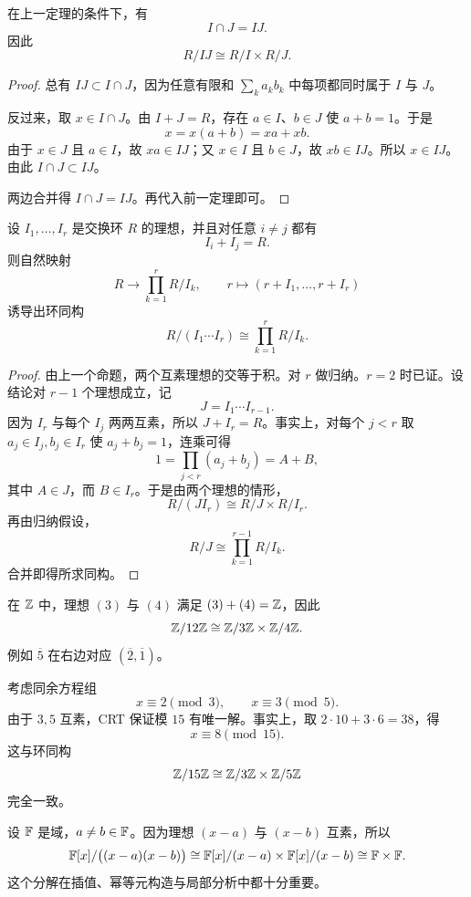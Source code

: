 \begin{proposition}
在上一定理的条件下，有
\[
I\cap J=IJ.
\]
因此
\[
R/IJ\cong R/I\times R/J.
\]
\end{proposition}

\begin{proof}
总有 $IJ\subset I\cap J$，因为任意有限和 $\sum_k a_kb_k$ 中每项都同时属于 $I$ 与 $J$。

反过来，取 $x\in I\cap J$。由 $I+J=R$，存在 $a\in I$、$b\in J$ 使 $a+b=1$。于是
\[
x=x(a+b)=xa+xb.
\]
由于 $x\in J$ 且 $a\in I$，故 $xa\in IJ$；又 $x\in I$ 且 $b\in J$，故 $xb\in IJ$。所以 $x\in IJ$。由此 $I\cap J\subset IJ$。

两边合并得 $I\cap J=IJ$。再代入前一定理即可。
\end{proof}

\begin{theorem}[有限个两两互素理想的情形]
设 $I_1,\dots,I_r$ 是交换环 $R$ 的理想，并且对任意 $i\neq j$ 都有
\[
I_i+I_j=R.
\]
则自然映射
\[
R\longrightarrow \prod_{k=1}^r R/I_k,
\qquad r\longmapsto (r+I_1,\dots,r+I_r)
\]
诱导出环同构
\[
R/(I_1\cdots I_r)\cong \prod_{k=1}^r R/I_k.
\]
\end{theorem}

\begin{proof}
由上一个命题，两个互素理想的交等于积。对 $r$ 做归纳。$r=2$ 时已证。设结论对 $r-1$ 个理想成立，记
\[
J=I_1\cdots I_{r-1}.
\]
因为 $I_r$ 与每个 $I_j$ 两两互素，所以 $J+I_r=R$。事实上，对每个 $j<r$ 取 $a_j\in I_j,b_j\in I_r$ 使 $a_j+b_j=1$，连乘可得
\[
1=\prod_{j<r}(a_j+b_j)=A+B,
\]
其中 $A\in J$，而 $B\in I_r$。于是由两个理想的情形，
\[
R/(JI_r)\cong R/J\times R/I_r.
\]
再由归纳假设，
\[
R/J\cong \prod_{k=1}^{r-1}R/I_k.
\]
合并即得所求同构。
\end{proof}

\begin{example}
在 $\mathbb{Z}$ 中，理想 $(3)$ 与 $(4)$ 满足 $(3)+(4)=\mathbb{Z}$，因此
\[
\mathbb{Z}/12\mathbb{Z}\cong \mathbb{Z}/3\mathbb{Z}\times \mathbb{Z}/4\mathbb{Z}.
\]
例如 $\overline{5}$ 在右边对应 $(\overline{2},\overline{1})$。
\end{example}

\begin{example}
考虑同余方程组
\[
x\equiv 2\pmod 3,
\qquad
x\equiv 3\pmod 5.
\]
由于 $3,5$ 互素，CRT 保证模 $15$ 有唯一解。事实上，取 $2\cdot 10+3\cdot 6=38$，得
\[
x\equiv 8\pmod{15}.
\]
这与环同构
\[
\mathbb{Z}/15\mathbb{Z}\cong \mathbb{Z}/3\mathbb{Z}\times \mathbb{Z}/5\mathbb{Z}
\]
完全一致。
\end{example}

\begin{example}
设 $\mathbb{F}$ 是域，$a\neq b\in \mathbb{F}$。因为理想 $(x-a)$ 与 $(x-b)$ 互素，所以
\[
\mathbb{F}[x]/\bigl((x-a)(x-b)\bigr)
\cong
\mathbb{F}[x]/(x-a)\times \mathbb{F}[x]/(x-b)
\cong \mathbb{F}\times \mathbb{F}.
\]
这个分解在插值、幂等元构造与局部分析中都十分重要。
\end{example}

